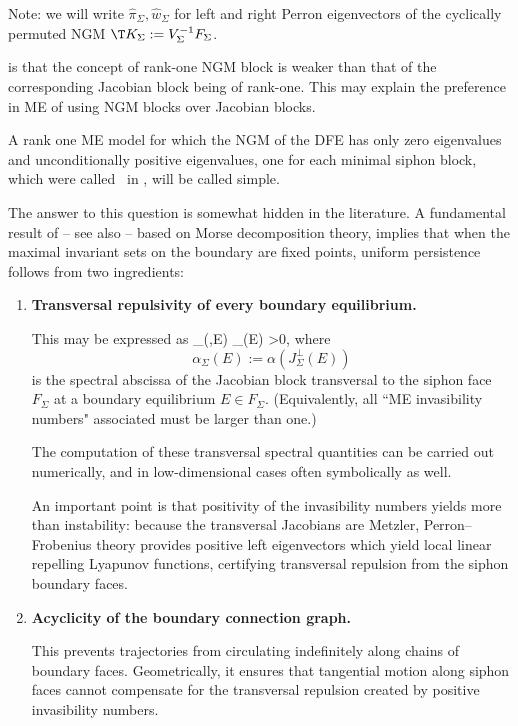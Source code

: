 Note:  we will
write $\hat\pi_\Sigma, \hat w_\Sigma$ for   left and right
Perron eigenvectors of the cyclically permuted NGM $\T K_\Sigma:= V_\Sigma^{-1} F_\Sigma$.
\eeD


 is that the concept of rank-one NGM block is weaker than that of the corresponding Jacobian block being of rank-one. This may explain the preference   in ME of using NGM blocks over  Jacobian blocks.\eeR



\label{d:simpM}
A rank one  ME model for which the NGM of the DFE has only zero eigenvalues and   unconditionally positive eigenvalues, one for each minimal siphon block,  which  were called
\repF\ in \cite{AABH25}, will be called simple.
\eeD




The answer to this question is somewhat hidden in
the literature.  A fundamental result of \cite{FreRuan} -- see also
\cite{wangZika2017,Bulh} -- based on Morse decomposition theory,
implies that when the maximal invariant sets on the boundary are fixed
points, uniform persistence follows from two ingredients:

\begin{enumerate}

\item \textbf{Transversal repulsivity of every boundary equilibrium.}

This may be expressed as
        \min_{(\Sigma,E)}
        \alpha_\Sigma(E)
        >0,
\ee
where
\[
        \alpha_\Sigma(E)
        :=
        \alpha\!\left(
        J_\Sigma^\perp(E)
        \right)
\]
is the spectral abscissa of the Jacobian block transversal to the
siphon face \(F_\Sigma\) at a boundary equilibrium \(E\in F_\Sigma\).
(Equivalently, all ``ME invasibility numbers" associated must be  larger than one.)

The computation of these transversal spectral quantities can be carried
out numerically, and in low-dimensional cases often symbolically as
well.

An important point is that positivity of the invasibility numbers yields
more than instability: because the transversal Jacobians are Metzler,
Perron--Frobenius theory provides positive left eigenvectors which
yield local linear repelling Lyapunov functions,  certifying transversal repulsion from
the siphon boundary faces.

\item \textbf{Acyclicity of the boundary connection graph.}

This prevents trajectories from circulating indefinitely along chains of
boundary faces.  Geometrically, it ensures that tangential motion along
siphon faces cannot compensate for the transversal repulsion created by
positive invasibility numbers.

\end{enumerate}

